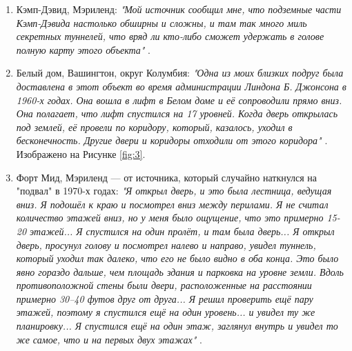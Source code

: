 \documentclass[10pt,twocolumn,letterpaper]{article}
\begin{document}
\begin{flushleft}
\begin{enumerate}
    \item Кэмп-Дэвид, Мэриленд: \textit{"Мой источник сообщил мне, что подземные части Кэмп-Дэвида настолько обширны и сложны, и там так много миль секретных туннелей, что вряд ли кто-либо сможет удержать в голове полную карту этого объекта"} \cite{22}.
    \item Белый дом, Вашингтон, округ Колумбия: \textit{"Одна из моих близких подруг была доставлена в этот объект во время администрации Линдона Б. Джонсона в 1960-х годах. Она вошла в лифт в Белом доме и её сопроводили прямо вниз. Она полагает, что лифт спустился на 17 уровней. Когда дверь открылась под землей, её провели по коридору, который, казалось, уходил в бесконечность. Другие двери и коридоры отходили от этого коридора"} \cite{22}. Изображено на Рисунке \ref{fig:3}.
    \item Форт Мид, Мэриленд — от источника, который случайно наткнулся на "подвал" в 1970-х годах: \textit{"Я открыл дверь, и это была лестница, ведущая вниз. Я подошёл к краю и посмотрел вниз между перилами. Я не считал количество этажей вниз, но у меня было ощущение, что это примерно 15-20 этажей... Я спустился на один пролёт, и там была дверь... Я открыл дверь, просунул голову и посмотрел налево и направо, увидел туннель, который уходил так далеко, что его не было видно в оба конца. Это было явно гораздо дальше, чем площадь здания и парковка на уровне земли. Вдоль противоположной стены были двери, расположенные на расстоянии примерно 30–40 футов друг от друга... Я решил проверить ещё пару этажей, поэтому я спустился ещё на один уровень... и увидел ту же планировку... Я спустился ещё на один этаж, заглянул внутрь и увидел то же самое, что и на первых двух этажах"} \cite{22}.
\end{enumerate}
\end{flushleft}
\end{document}
